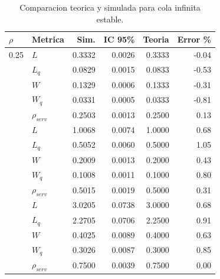 \begin{table}[htbp]
\centering
\caption{Comparacion teorica y simulada para cola infinita estable.}
\label{tab:mm1-infinite-steady}
\begin{tabular}{llrrrr}
\toprule
$\rho$ & Metrica & Sim. & IC 95\% & Teoria & Error \% \\
\midrule
0.25 & $L$ & 0.3332 & 0.0026 & 0.3333 & -0.04 \\
 & $L_q$ & 0.0829 & 0.0015 & 0.0833 & -0.53 \\
 & $W$ & 0.1329 & 0.0006 & 0.1333 & -0.31 \\
 & $W_q$ & 0.0331 & 0.0005 & 0.0333 & -0.81 \\
 & $\rho_{serv}$ & 0.2503 & 0.0013 & 0.2500 & 0.13 \\
\addlinespace
0.50 & $L$ & 1.0068 & 0.0074 & 1.0000 & 0.68 \\
 & $L_q$ & 0.5052 & 0.0060 & 0.5000 & 1.05 \\
 & $W$ & 0.2009 & 0.0013 & 0.2000 & 0.43 \\
 & $W_q$ & 0.1008 & 0.0011 & 0.1000 & 0.80 \\
 & $\rho_{serv}$ & 0.5015 & 0.0019 & 0.5000 & 0.31 \\
\addlinespace
0.75 & $L$ & 3.0205 & 0.0738 & 3.0000 & 0.68 \\
 & $L_q$ & 2.2705 & 0.0706 & 2.2500 & 0.91 \\
 & $W$ & 0.4025 & 0.0089 & 0.4000 & 0.63 \\
 & $W_q$ & 0.3026 & 0.0087 & 0.3000 & 0.85 \\
 & $\rho_{serv}$ & 0.7500 & 0.0039 & 0.7500 & 0.00 \\
\bottomrule
\end{tabular}
\end{table}

